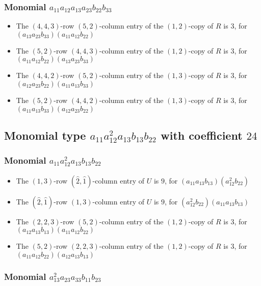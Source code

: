 \documentclass{article}
\begin{document}
\subsubsection{Monomial $ a_{11} a_{12} a_{13} a_{23} b_{22} b_{33} $}

\begin{itemize}
\item The $(4, 4, 3)$-row $(5, 2)$-column entry of the $ \left(1, 2\right) $-copy of $R$ is $ 3 $, for $( a_{13} a_{23} b_{33} )( a_{11} a_{12} b_{22} )$ 
\item The $(5, 2)$-row $(4, 4, 3)$-column entry of the $ \left(1, 2\right) $-copy of $R$ is $ 3 $, for $( a_{11} a_{12} b_{22} )( a_{13} a_{23} b_{33} )$ 
\item The $(4, 4, 2)$-row $(5, 2)$-column entry of the $ \left(1, 3\right) $-copy of $R$ is $ 3 $, for $( a_{12} a_{23} b_{22} )( a_{11} a_{13} b_{33} )$ 
\item The $(5, 2)$-row $(4, 4, 2)$-column entry of the $ \left(1, 3\right) $-copy of $R$ is $ 3 $, for $( a_{11} a_{13} b_{33} )( a_{12} a_{23} b_{22} )$ 
\end{itemize}
\subsection{Monomial type $ a_{11} a_{12}^{2} a_{13} b_{13} b_{22} $ with coefficient $ 24 $}

\subsubsection{Monomial $ a_{11} a_{12}^{2} a_{13} b_{13} b_{22} $}

\begin{itemize}
\item The $ \left(1, 3\right) $-row $ (\hat{2}, \hat{1}) $-column entry of $U$ is $ 9 $, for $( a_{11} a_{13} b_{13} )( a_{12}^{2} b_{22} )$ 
\item The $(\hat{2}, \hat{1})$-row $ \left(1, 3\right) $-column entry of $U$ is $ 9 $, for $( a_{12}^{2} b_{22} )( a_{11} a_{13} b_{13} )$ 
\item The $(2, 2, 3)$-row $(5, 2)$-column entry of the $ \left(1, 2\right) $-copy of $R$ is $ 3 $, for $( a_{12} a_{13} b_{13} )( a_{11} a_{12} b_{22} )$ 
\item The $(5, 2)$-row $(2, 2, 3)$-column entry of the $ \left(1, 2\right) $-copy of $R$ is $ 3 $, for $( a_{11} a_{12} b_{22} )( a_{12} a_{13} b_{13} )$ 
\end{itemize}
\subsubsection{Monomial $ a_{13}^{2} a_{23} a_{33} b_{11} b_{23} $}
\end{document}
